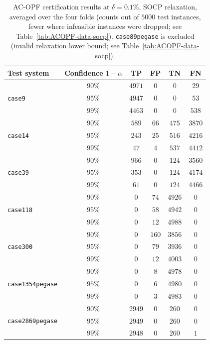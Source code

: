 \documentclass[10pt]{article} %
\theoremstyle{plain}
\theoremstyle{definition}
\theoremstyle{remark}
\begin{document}
\begin{table}[H]
\centering
\footnotesize
\caption{AC-OPF certification results at $\delta = 0.1\%$, SOCP relaxation, averaged over the four folds (counts out of $5000$ test instances, fewer where infeasible instances were dropped; see Table~\ref{tab:ACOPF-data-socp}). \texttt{case89pegase} is excluded (invalid relaxation lower bound; see Table~\ref{tab:ACOPF-data-socp}).}
\begin{tabular}{lc cccc}
\toprule
\textbf{Test system} & \textbf{Confidence } $1-\alpha$ & \textbf{TP} & \textbf{FP} & \textbf{TN} & \textbf{FN} \\
\midrule
\multirow{3}{*}{\texttt{case9}} & $90\%$ & $4971$ & $0$ & $0$ & $29$ \\
 & $95\%$ & $4947$ & $0$ & $0$ & $53$ \\
 & $99\%$ & $4463$ & $0$ & $0$ & $538$ \\
\midrule
\multirow{3}{*}{\texttt{case14}} & $90\%$ & $589$ & $66$ & $475$ & $3870$ \\
 & $95\%$ & $243$ & $25$ & $516$ & $4216$ \\
 & $99\%$ & $47$  & $4$  & $537$ & $4412$ \\
\midrule
\multirow{3}{*}{\texttt{case39}} & $90\%$ & $966$ & $0$ & $124$ & $3560$ \\
 & $95\%$ & $353$ & $0$ & $124$ & $4174$ \\
 & $99\%$ & $61$  & $0$ & $124$ & $4466$ \\
\midrule
\multirow{3}{*}{\texttt{case118}} & $90\%$ & $0$ & $74$  & $4926$ & $0$ \\
 & $95\%$ & $0$ & $58$  & $4942$ & $0$ \\
 & $99\%$ & $0$ & $12$  & $4988$ & $0$ \\
\midrule
\multirow{3}{*}{\texttt{case300}} & $90\%$ & $0$ & $160$ & $3856$ & $0$ \\
 & $95\%$ & $0$ & $79$  & $3936$ & $0$ \\
 & $99\%$ & $0$ & $12$  & $4003$ & $0$ \\
\midrule
\multirow{3}{*}{\texttt{case1354pegase}} & $90\%$ & $0$ & $8$ & $4978$ & $0$ \\
 & $95\%$ & $0$ & $6$ & $4980$ & $0$ \\
 & $99\%$ & $0$ & $3$ & $4983$ & $0$ \\
\midrule
\multirow{3}{*}{\texttt{case2869pegase}} & $90\%$ & $2949$ & $0$ & $260$ & $0$ \\
 & $95\%$ & $2949$ & $0$ & $260$ & $0$ \\
 & $99\%$ & $2948$ & $0$ & $260$ & $1$ \\
\bottomrule
\end{tabular}
\label{tab:ACOPF-cert-socp}
\end{table}
\end{document}
